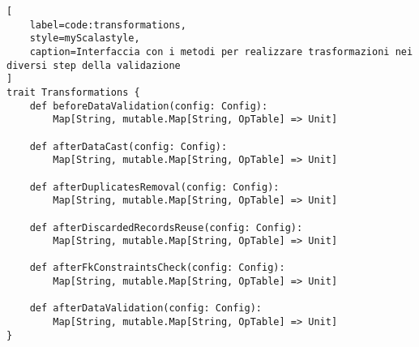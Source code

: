 \begin{lstlisting}[
    label=code:transformations,
    style=myScalastyle,
    caption=Interfaccia con i metodi per realizzare trasformazioni nei diversi step della validazione
]
trait Transformations {
    def beforeDataValidation(config: Config):
        Map[String, mutable.Map[String, OpTable] => Unit]

    def afterDataCast(config: Config):
        Map[String, mutable.Map[String, OpTable] => Unit]

    def afterDuplicatesRemoval(config: Config):
        Map[String, mutable.Map[String, OpTable] => Unit]

    def afterDiscardedRecordsReuse(config: Config):
        Map[String, mutable.Map[String, OpTable] => Unit]

    def afterFkConstraintsCheck(config: Config):
        Map[String, mutable.Map[String, OpTable] => Unit]

    def afterDataValidation(config: Config):
        Map[String, mutable.Map[String, OpTable] => Unit]
}
\end{lstlisting}